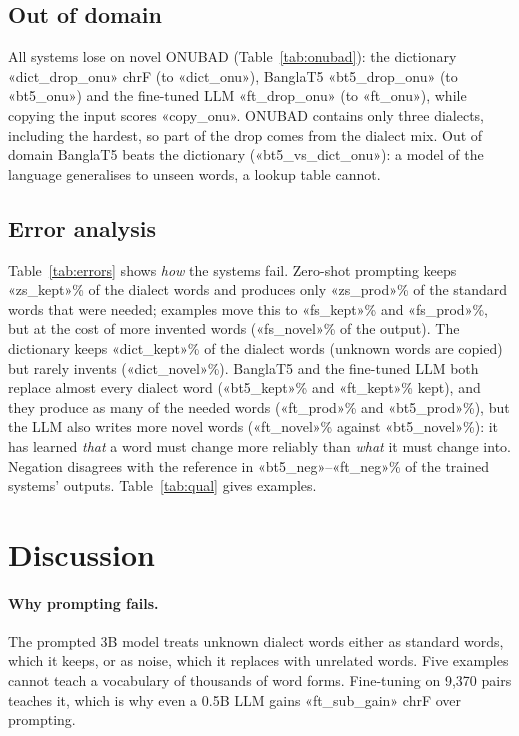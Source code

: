\documentclass[10pt,twocolumn]{article}
\begin{document}


\subsection{Out of domain}
All systems lose on novel ONUBAD (Table~\ref{tab:onubad}): the dictionary «dict_drop_onu» chrF (to
«dict_onu»), BanglaT5 «bt5_drop_onu» (to «bt5_onu») and the fine-tuned LLM «ft_drop_onu» (to «ft_onu»), while
copying the input scores «copy_onu». ONUBAD contains only three dialects, including the hardest, so part of
the drop comes from the dialect mix. Out of domain BanglaT5 beats the dictionary («bt5_vs_dict_onu»): a model
of the language generalises to unseen words, a lookup table cannot.



\subsection{Error analysis}
Table~\ref{tab:errors} shows \emph{how} the systems fail. Zero-shot prompting keeps «zs_kept»\% of the
dialect words and produces only «zs_prod»\% of the standard words that were needed; examples move this to
«fs_kept»\% and «fs_prod»\%, but at the cost of more invented words («fs_novel»\% of the output). The
dictionary keeps «dict_kept»\% of the dialect words (unknown words are copied) but rarely invents
(«dict_novel»\%). BanglaT5 and the fine-tuned LLM both replace almost every dialect word («bt5_kept»\% and
«ft_kept»\% kept), and they produce as many of the needed words («ft_prod»\% and «bt5_prod»\%), but the LLM also writes
more novel words («ft_novel»\% against «bt5_novel»\%): it has learned \emph{that} a word must change more reliably
than \emph{what} it must change into. Negation disagrees with the reference in «bt5_neg»--«ft_neg»\% of the
trained systems' outputs. Table~\ref{tab:qual} gives examples.




\section{Discussion}
\paragraph{Why prompting fails.} The prompted 3B model treats unknown dialect words either as standard words,
which it keeps, or as noise, which it replaces with unrelated words. Five examples cannot teach a vocabulary
of thousands of word forms. Fine-tuning on 9,370 pairs teaches it, which is why even a 0.5B LLM gains
«ft_sub_gain» chrF over prompting.
\end{document}
